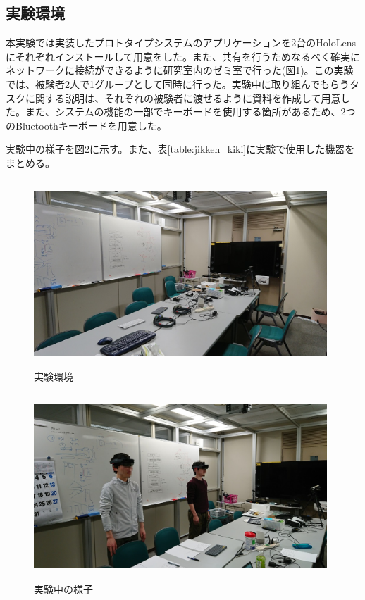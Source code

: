 \documentclass[11pt,a4j, titlepage]{jarticle} %
\begin{document}
\subsection{実験環境}
本実験では実装したプロトタイプシステムのアプリケーションを2台のHoloLensにそれぞれインストールして用意をした。また、共有を行うためなるべく確実にネットワークに接続ができるように研究室内のゼミ室で行った(図\ref{fig:jikken_kankyo})。この実験では、被験者2人で1グループとして同時に行った。実験中に取り組んでもらうタスクに関する説明は、それぞれの被験者に渡せるように資料を作成して用意した。また、システムの機能の一部でキーボードを使用する箇所があるため、2つのBluetoothキーボードを用意した。

実験中の様子を図\ref{fig:jikkenchu}に示す。また、表\ref{table:jikken_kiki}に実験で使用した機器をまとめる。

\begin{figure}[H]
  \begin{center}
    \includegraphics[clip,height=7.0cm,width=11.0cm]{./jikken_kankyo.eps}
    \caption{実験環境}
    \label{fig:jikken_kankyo}
  \end{center}
\end{figure}

\begin{figure}[H]
  \begin{center}
    \includegraphics[clip,height=7.0cm,width=11.0cm]{./jikkenchu.eps}
    \caption{実験中の様子}
    \label{fig:jikkenchu}
  \end{center}
\end{figure}
\end{document}
